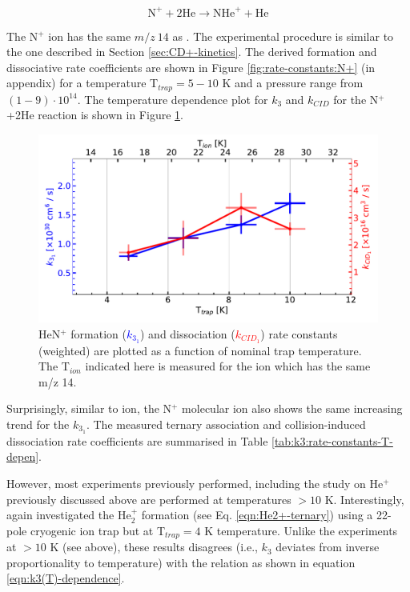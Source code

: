 \[ \text{N}^+ + 2\text{He} \rightarrow \text{NHe}^+ + \text{He}\]

The N$^+$ ion has the same $m/z\ 14$ as \CD. The experimental procedure is
similar to the one described in Section \ref{sec:CD+-kinetics}. The derived
formation and dissociative rate coefficients are shown in Figure
\ref{fig:rate-constants:N+} (in appendix) for a temperature T$_{trap}=5-10$ K
and a pressure range from $(1 - 9 ) \cdot 10^{14}$\percc. The temperature
dependence plot for $k_3$ and $k_{CID}$ for the N$^+$+2He reaction is shown in
Figure \ref{fig:HeN+:rate-constants-f(t)}.

\begin{figure}[!htb]
    \centering
    \includegraphics[width=1\textwidth]{figures/measurements/kinetics/functionOf_T/N+/off_k3_kCID_as_functionOfT_with_Tcol.pdf}
    \caption{HeN$^+$ formation (\textcolor{blue}{$k_{3_1}$}) and dissociation (\textcolor{red}{$k_{CID_1}$}) rate constants (weighted) are plotted as a function of nominal trap temperature. The T$_{ion}$ indicated here is measured for the \CD ion which has the same m/z 14.}
    \label{fig:HeN+:rate-constants-f(t)}
\end{figure}


Surprisingly, similar to \CD ion, the N$^+$ molecular ion also shows the same increasing trend for the $k_{3_1}$. The measured ternary association and collision-induced dissociation rate coefficients are summarised in Table \ref{tab:k3:rate-constants-T-depen}.

However, most experiments previously performed, including the study on He$^+$
previously discussed above are performed at temperatures $>10$ K.
Interestingly, \citet{gerlich_infrared_2018} again investigated the He$_2^+$
formation (see Eq. \ref{eqn:He2+-ternary}) using a 22-pole cryogenic ion trap
but at T$_{trap}=4$ K temperature. Unlike the experiments at $>10$ K (see
above), these results disagrees (i.e., $k_3$ deviates from inverse proportionality to temperature) with the
relation as shown in equation \ref{eqn:k3(T)-dependence}.

